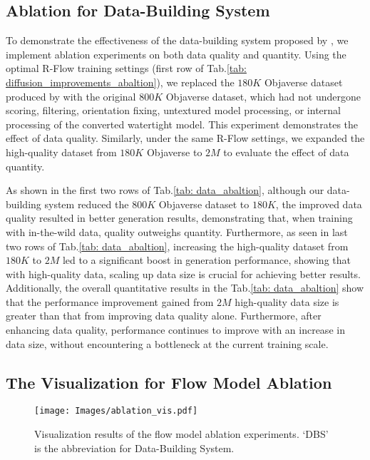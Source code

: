 \subsection{Ablation for Data-Building System}
To demonstrate the effectiveness of the data-building system proposed by \method{}, we implement ablation experiments on both data quality and quantity. Using the optimal R-Flow training settings (first row of Tab.\ref{tab: diffusion_improvements_abaltion}), we replaced the $180K$ Objaverse dataset produced by \method{} with the original $800K$ Objaverse dataset, which had not undergone scoring, filtering, orientation fixing, untextured model processing, or internal processing of the converted watertight model. This experiment demonstrates the effect of data quality. Similarly, under the same R-Flow settings, we expanded the high-quality dataset from $180K$ Objaverse to $2M$ \method{} to evaluate the effect of data quantity.

As shown in the first two rows of Tab.\ref{tab: data_abaltion}, although our data-building system reduced the $800K$ Objaverse dataset to $180K$, the improved data quality resulted in better generation results, demonstrating that, when training with in-the-wild data, quality outweighs quantity. Furthermore, as seen in last two rows of Tab.\ref{tab: data_abaltion}, increasing the high-quality dataset from $180K$ to $2M$ led to a significant boost in generation performance, showing that with high-quality data, scaling up data size is crucial for achieving better results. 
Additionally, the overall quantitative results in the Tab.\ref{tab: data_abaltion} show that the performance improvement gained from $2M$ high-quality data size is greater than that from improving data quality alone. Furthermore, after enhancing data quality, performance continues to improve with an increase in data size, without encountering a bottleneck at the current training scale.


\subsection{The Visualization for Flow Model Ablation}
\begin{figure*}
    \centering
    \texttt{[image: Images/ablation\_vis.pdf]}
    \vspace{-1em}
    \caption{Visualization results of the flow model ablation experiments. `DBS' is the abbreviation for Data-Building System.
    }
    \vspace{-1em}
    \label{fig:ablation_vis}
\end{figure*}

